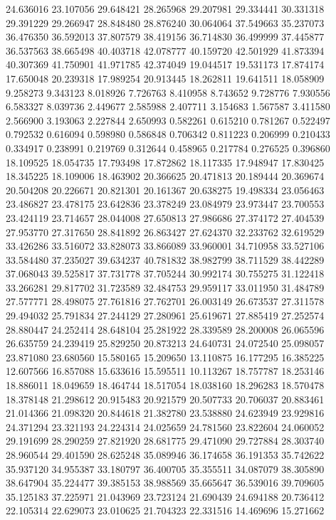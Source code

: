24.636016
23.107056
29.648421
28.265968
29.207981
29.334441
30.331318
29.391229
29.266947
28.848480
28.876240
30.064064
37.549663
35.237073
36.476350
36.592013
37.807579
38.419156
36.714830
36.499999
37.445877
36.537563
38.665498
40.403718
42.078777
40.159720
42.501929
41.873394
40.307369
41.750901
41.971785
42.374049
19.044517
19.531173
17.874174
17.650048
20.239318
17.989254
20.913445
18.262811
19.641511
18.058909
9.258273
9.343123
8.018926
7.726763
8.410958
8.743652
9.728776
7.930556
6.583327
8.039736
2.449677
2.585988
2.407711
3.154683
1.567587
3.411580
2.566900
3.193063
2.227844
2.650993
0.582261
0.615210
0.781267
0.522497
0.792532
0.616094
0.598980
0.586848
0.706342
0.811223
0.206999
0.210433
0.334917
0.238991
0.219769
0.312644
0.458965
0.217784
0.276525
0.396860
18.109525
18.054735
17.793498
17.872862
18.117335
17.948947
17.830425
18.345225
18.109006
18.463902
20.366625
20.471813
20.189444
20.369674
20.504208
20.226671
20.821301
20.161367
20.638275
19.498334
23.056463
23.486827
23.478175
23.642836
23.378249
23.084979
23.973447
23.700553
23.424119
23.714657
28.044008
27.650813
27.986686
27.374172
27.404539
27.953770
27.317650
28.841892
26.863427
27.624370
32.233762
32.619529
33.426286
33.516072
33.828073
33.866089
33.960001
34.710958
33.527106
33.584480
37.235027
39.634237
40.781832
38.982799
38.711529
38.442289
37.068043
39.525817
37.731778
37.705244
30.992174
30.755275
31.122418
33.266281
29.817702
31.723589
32.484753
29.959117
33.011950
31.484789
27.577771
28.498075
27.761816
27.762701
26.003149
26.673537
27.311578
29.494032
25.791834
27.244129
27.280961
25.619671
27.885419
27.252574
28.880447
24.252414
28.648104
25.281922
28.339589
28.200008
26.065596
26.635759
24.239419
25.829250
20.873213
24.640731
24.072540
25.098057
23.871080
23.680560
15.580165
15.209650
13.110875
16.177295
16.385225
12.607566
16.857088
15.633616
15.595511
10.113267
18.757787
18.253146
18.886011
18.049659
18.464744
18.517054
18.038160
18.296283
18.570478
18.378148
21.298612
20.915483
20.921579
20.507733
20.706037
20.883461
21.014366
21.098320
20.844618
21.382780
23.538880
24.623949
23.929816
24.371294
23.321193
24.224314
24.025659
24.781560
23.822604
24.060052
29.191699
28.290259
27.821920
28.681775
29.471090
29.727884
28.303740
28.960544
29.401590
28.625248
35.089946
36.174658
36.191353
35.742622
35.937120
34.955387
33.180797
36.400705
35.355511
34.087079
38.305890
38.647904
35.224477
39.385153
38.988569
35.665647
36.539016
39.709605
35.125183
37.225971
21.043969
23.723124
21.690439
24.694188
20.736412
22.105314
22.629073
23.010625
21.704323
22.331516
14.469696
15.271662
